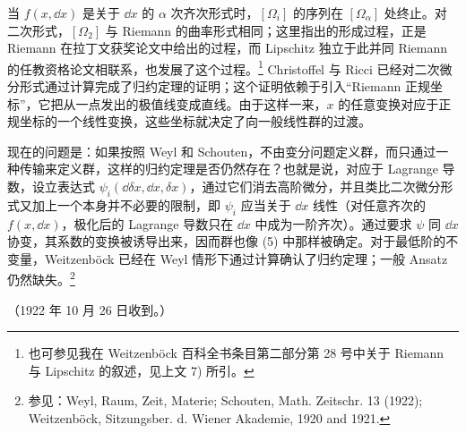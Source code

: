 当 $f(x,\dd x)$ 是关于 $\dd x$ 的 $\alpha$ 次齐次形式时，$[\Omega_i]$ 的序列在 $[\Omega_\alpha]$ 处终止。对二次形式，$[\Omega_2]$ 与 Riemann 的曲率形式相同；这里指出的形成过程，正是 Riemann 在拉丁文获奖论文中给出的过程，而 Lipschitz 独立于此并同 Riemann 的任教资格论文相联系，也发展了这个过程。\footnote{也可参见我在 Weitzenböck 百科全书条目第二部分第 28 号中关于 Riemann 与 Lipschitz 的叙述，见上文 7) 所引。} Christoffel 与 Ricci 已经对二次微分形式通过计算完成了归约定理的证明；这个证明依赖于引入“Riemann 正规坐标”，它把从一点发出的极值线变成直线。由于这样一来，$x$ 的任意变换对应于正规坐标的一个线性变换，这些坐标就决定了向一般线性群的过渡。

现在的问题是：如果按照 Weyl 和 Schouten，不由变分问题定义群，而只通过一种传输来定义群，这样的归约定理是否仍然存在？也就是说，对应于 Lagrange 导数，设立表达式 $\psi_i(\dd\delta x,\dd x,\delta x)$，通过它们消去高阶微分，并且类比二次微分形式又加上一个本身并不必要的限制，即 $\psi_i$ 应当关于 $\dd x$ 线性（对任意齐次的 $f(x,\dd x)$，极化后的 Lagrange 导数只在 $\dd x$ 中成为一阶齐次）。通过要求 $\psi$ 同 $\dd x$ 协变，其系数的变换被诱导出来，因而群也像 (5) 中那样被确定。对于最低阶的不变量，Weitzenböck 已经在 Weyl 情形下通过计算确认了归约定理；一般 Ansatz 仍然缺失。\footnote{参见：Weyl, Raum, Zeit, Materie; Schouten, Math. Zeitschr. 13 (1922); Weitzenböck, Sitzungsber. d. Wiener Akademie, 1920 and 1921.}

\begin{center}
（1922 年 10 月 26 日收到。）
\end{center}

